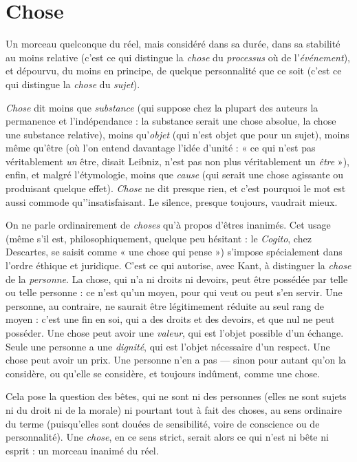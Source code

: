\section{Chose}
Un morceau quelconque du réel, mais considéré dans sa durée,
dans sa stabilité au moins relative (c’est ce qui distingue la {\it chose} du
{\it processus} où de l'{\it événement}), et dépourvu, du moins en principe, de quelque
personnalité que ce soit (c’est ce qui distingue la {\it chose} du {\it sujet}).

{\it Chose} dit moins que {\it substance} (qui suppose chez la plupart des auteurs la
permanence et l'indépendance : la substance serait une chose absolue, la chose
une substance relative), moins qu’{\it objet} (qui n’est objet que pour un sujet),
moins même qu'être (où l’on entend davantage l’idée d’unité : « ce qui n'est
pas véritablement {\it un} être, disait Leibniz, n’est pas non plus véritablement un
{\it être} »), enfin, et malgré l’étymologie, moins que {\it cause} (qui serait une chose agissante
ou produisant quelque effet). {\it Chose} ne dit presque rien, et c’est pourquoi
le mot est aussi commode qu'’insatisfaisant. Le silence, presque toujours, vaudrait
mieux.

On ne parle ordinairement de {\it choses} qu’à propos d’êtres inanimés. Cet
usage (même s’il est, philosophiquement, quelque peu hésitant : le {\it Cogito}, chez
Descartes, se saisit comme « une chose qui pense ») s'impose spécialement dans
l’ordre éthique et juridique. C’est ce qui autorise, avec Kant, à distinguer la
{\it chose} de la {\it personne}. La chose, qui n’a ni droits ni devoirs, peut être possédée
par telle ou telle personne : ce n’est qu’un moyen, pour qui veut ou peut s’en
servir. Une personne, au contraire, ne saurait être légitimement réduite au seul
rang de moyen : c’est une fin en soi, qui a des droits et des devoirs, et que nul
ne peut posséder. Une chose peut avoir une {\it valeur}, qui est l’objet possible d’un
échange. Seule une personne a une {\it dignité}, qui est l’objet nécessaire d’un respect.
Une chose peut avoir un prix. Une personne n’en a pas — sinon pour
autant qu'on la considère, ou qu’elle se considère, et toujours indûment,
comme une chose.

Cela pose la question des bêtes, qui ne sont ni des personnes (elles ne sont
sujets ni du droit ni de la morale) ni pourtant tout à fait des choses, au sens
ordinaire du terme (puisqu'elles sont douées de sensibilité, voire de conscience
ou de personnalité). Une {\it chose}, en ce sens strict, serait alors ce qui n’est ni bête
ni esprit : un morceau inanimé du réel.

